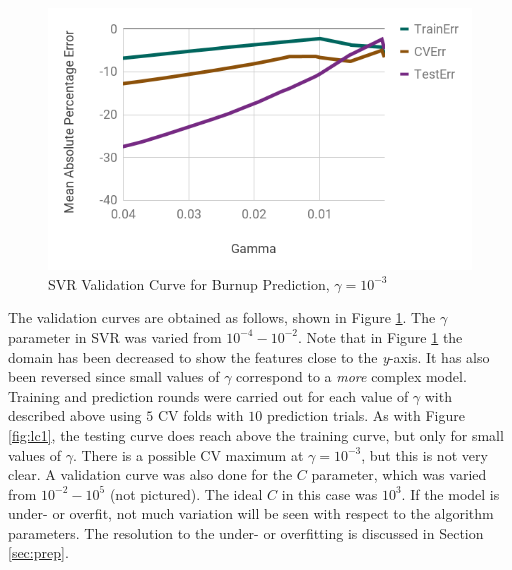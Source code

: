 \begin{figure}[!htb]
    \centering
    \includegraphics[width=\linewidth]{./chapters/demo_method/vc1.png}
    \caption{\acrshort{SVR} Validation Curve for Burnup Prediction, $\gamma = 10^{-3}$}
    \label{fig:vc1}
\end{figure}

The validation curves are obtained as follows, shown in Figure \ref{fig:vc1}.
The $\gamma$ parameter in \gls{SVR} was varied from $10^{-4}-10^{-2}$.  Note
that in Figure \ref{fig:vc1} the domain has been decreased to show the features
close to the \textit{y}-axis.  It has also been reversed since small values of
$\gamma$ correspond to a \textit{more} complex model.  Training and prediction
rounds were carried out for each value of $\gamma$ with described above using
$5$ \gls{CV} folds with $10$ prediction trials.  As with Figure \ref{fig:lc1},
the testing curve does reach above the training curve, but only for small
values of $\gamma$.  There is a possible \gls{CV} maximum at $\gamma=10^{-3}$,
but this is not very clear.  A validation curve was also done for the $C$
parameter, which was varied from $10^{-2}-10^{5}$ (not pictured). The ideal $C$
in this case was $10^{3}$.  If the model is under- or overfit, not much
variation will be seen with respect to the algorithm parameters. The resolution
to the under- or overfitting is discussed in Section \ref{sec:prep}.


